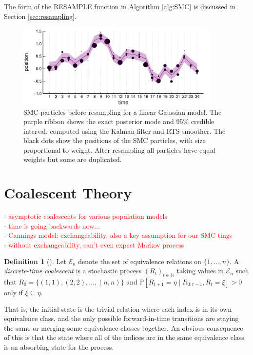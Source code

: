 \documentclass[fleqn]{article}
\theoremstyle{definition}
\newtheorem{defn}{Definition}
\newcommand{\PR}{\mathbb{P}}
\begin{document}
The form of the {\footnotesize RESAMPLE} function in Algorithm \ref{alg:SMC} is discussed in Section \ref{sec:resampling}.

\begin{figure}
\centering
\includegraphics[width=0.9\textwidth]{smc_kalman.pdf}
\caption{SMC particles before resampling for a linear Gaussian model. The purple ribbon shows the exact posterior mode and 95\% credible interval, computed using the Kalman filter and RTS smoother. The black dots show the positions of the SMC particles, with size proportional to weight. After resampling all particles have equal weights but some are duplicated.}
\label{fig:SMC_vs_kalman}
\end{figure}


\section{Coalescent Theory}\label{sec:coalescent_theory}
\textcolor{red}{
- asymptotic coalescents for various population models\\
- time is going backwards now...\\
- Cannings model: exchangeability, also a key assumption for our SMC tings\\
- without exchangeability, can't even expect Markov process
}

\begin{defn}[\citet{mohle1998}]
Let $\mathcal{E}_n$ denote the set of equivalence relations on $\{1,\dots,n\}$.
A \emph{discrete-time coalescent} is a stochastic process $(R_t)_{t\in\mathbb{N}}$ taking values in $\mathcal{E}_n$ such that 
$R_0 = \{(1,1),(2,2),\dots,(n,n)\}$ and $\PR[R_{t+1} = \eta \mid R_{0:t-1}, R_{t} = \xi] > 0$ only if $\xi \subseteq \eta$.
\end{defn}
That is, the initial state is the trivial relation where each index is in its own equivalence class, and the only possible forward-in-time transitions are staying the same or merging some equivalence classes together.
An obvious consequence of this is that the state where all of the indices are in the same equivalence class is an absorbing state for the process.
\end{document}
